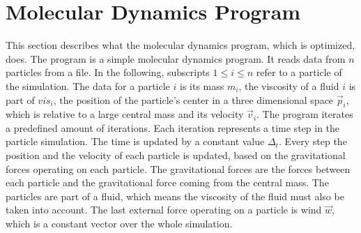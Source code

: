 \documentclass[twoside,11pt]{article}
\begin{document}
\section{Molecular Dynamics Program} %
\label{sec:md}

This section describes what the molecular dynamics program, which is
optimized, does.
The program is a simple molecular dynamics program.
It reads data from $n$ particles from a file.
In the following, subscripts $1 \leq i \leq n$ refer to a particle
of the simulation.
The data for a particle $i$ is its mass $m_i$, the viscosity of
a fluid $i$ is part of $vis_i$, the position of the particle's center
in a three dimensional space $\vec{p}_i$, which is relative to a large
central mass and its velocity $\vec{v}_i$.
The program iterates a predefined amount of iterations.
Each iteration represents a time step in the particle simulation.
The time is updated by a constant value $\Delta_t$.
Every step the position and the velocity of each particle is
updated, based on the gravitational forces operating on each particle.
The gravitational forces are the forces between each particle and the
gravitational force coming from the central mass.
The particles are part of a fluid, which means the viscosity of
the fluid must also be taken into account.
The last external force operating on a particle is wind $\vec{w}$,
which is a constant vector over the whole simulation.
\end{document}

